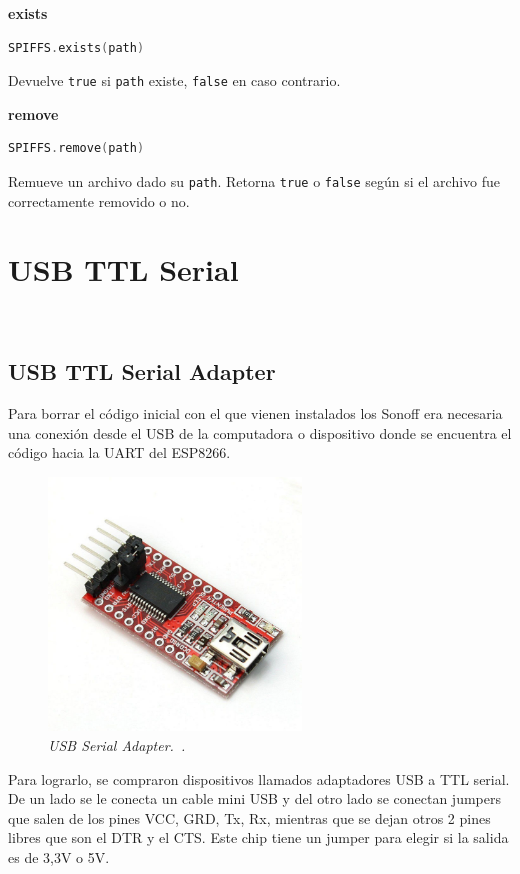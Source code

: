 \textbf{exists}
\begin{lstlisting}[language=C]
SPIFFS.exists(path)
\end{lstlisting}
Devuelve \lstinline[columns=fixed]{true} si \lstinline[columns=fixed]{path} existe, \lstinline[columns=fixed]{false} en caso contrario.

\textbf{remove}
\begin{lstlisting}[language=C]
SPIFFS.remove(path)
\end{lstlisting}
Remueve un archivo dado su \lstinline[columns=fixed]{path}. Retorna \lstinline[columns=fixed]{true} o \lstinline[columns=fixed]{false} según si el archivo fue correctamente removido o no.


\section{USB TTL Serial} ~

\subsection{USB TTL Serial Adapter}
Para borrar el código inicial con el que vienen instalados los Sonoff era necesaria una conexión desde el USB de la computadora o dispositivo donde se encuentra el código hacia la UART del ESP8266.

\begin{figure}[h!]
  \centering
  \includegraphics[width=0.6\textwidth, keepaspectratio]{images/usb-serial-adapter}
  \caption{\textit{USB Serial Adapter.~\cite{USBSerialAdapter}.}}
  \label{fig:usb-serial-adapter}
\end{figure}

Para lograrlo, se compraron dispositivos llamados adaptadores USB a TTL serial. De un lado se le conecta un cable mini USB y del otro lado se conectan jumpers que salen de los pines VCC, GRD, Tx, Rx, mientras que se dejan otros 2 pines libres que son el DTR y el CTS. Este chip tiene un jumper para elegir si la salida es de 3,3V o 5V.



